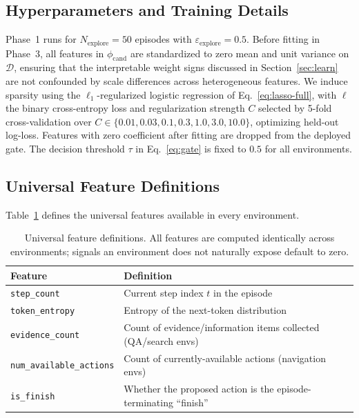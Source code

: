 \subsection{Hyperparameters and Training Details}
\label{app:hyperparams-details}

Phase~1 runs for $N_{\text{explore}} = 50$ episodes with
$\varepsilon_{\text{explore}} = 0.5$. Before fitting in Phase~3,
all features in $\phi_{\text{cand}}$ are standardized to zero mean
and unit variance on $\mathcal{D}$, ensuring that the interpretable
weight signs discussed in Section~\ref{sec:learn} are not
confounded by scale differences across heterogeneous features.
We induce sparsity using the $\ell_1$-regularized logistic
regression of Eq.~\eqref{eq:lasso-full}, with $\ell$ the binary
cross-entropy loss and regularization strength $C$ selected by
5-fold cross-validation over
$C \in \{0.01, 0.03, 0.1, 0.3, 1.0, 3.0, 10.0\}$, optimizing
held-out log-loss. Features with zero coefficient after fitting
are dropped from the deployed gate. The decision threshold $\tau$
in Eq.~\eqref{eq:gate} is fixed to $0.5$ for all environments.

\subsection{Universal Feature Definitions}
\label{app:universal-features}

Table~\ref{tab:universal-features} defines the universal features
available in every environment.

\begin{table}[H]
\centering\small
\caption{Universal feature definitions. All features are
computed identically across environments; signals an
environment does not naturally expose default to zero.}
\label{tab:universal-features}
\begin{tabular}{ll}
\toprule
Feature & Definition \\
\midrule
\texttt{step\_count}            & Current step index $t$ in the episode \\
\texttt{token\_entropy}         & Entropy of the next-token distribution \\
\texttt{evidence\_count}        & Count of evidence/information items collected (QA/search envs) \\
\texttt{num\_available\_actions}& Count of currently-available actions (navigation envs) \\
\texttt{is\_finish}             & Whether the proposed action is the episode-terminating ``finish'' \\
\bottomrule
\end{tabular}
\end{table}

